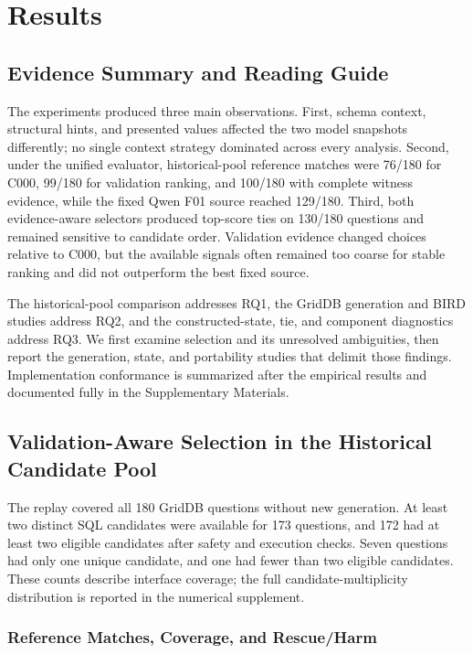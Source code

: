 \documentclass[information,article,submit,moreauthors]{Definitions/mdpi}
\begin{document}
\section{Results}

\subsection{Evidence Summary and Reading Guide}

The experiments produced three main observations. First, schema context, structural hints, and presented values affected the two model snapshots differently; no single context strategy dominated across every analysis. Second, under the unified evaluator, historical-pool reference matches were 76/180 for C000, 99/180 for validation ranking, and 100/180 with complete witness evidence, while the fixed Qwen F01 source reached 129/180. Third, both evidence-aware selectors produced top-score ties on 130/180 questions and remained sensitive to candidate order. Validation evidence changed choices relative to C000, but the available signals often remained too coarse for stable ranking and did not outperform the best fixed source.

The historical-pool comparison addresses RQ1, the GridDB generation and BIRD studies address RQ2, and the constructed-state, tie, and component diagnostics address RQ3. We first examine selection and its unresolved ambiguities, then report the generation, state, and portability studies that delimit those findings. Implementation conformance is summarized after the empirical results and documented fully in the Supplementary Materials.

\subsection{Validation-Aware Selection in the Historical Candidate Pool}

The replay covered all 180 GridDB questions without new generation. At least two distinct SQL candidates were available for 173 questions, and 172 had at least two eligible candidates after safety and execution checks. Seven questions had only one unique candidate, and one had fewer than two eligible candidates. These counts describe interface coverage; the full candidate-multiplicity distribution is reported in the numerical supplement.

\subsubsection{Reference Matches, Coverage, and Rescue/Harm}
\end{document}
